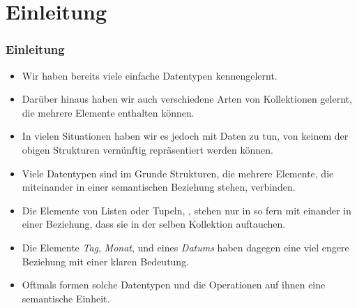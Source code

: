\documentclass[aspectratio=169,mathserif,notheorems]{beamer}%
\subtitle{41.~Klassen:~Grundlagen}%
\begin{document}
%
%
\startPresentation%
%
\section{Einleitung}%
\begin{frame}%
\frametitle{Einleitung}%
\begin{itemize}%
%
\item Wir haben bereits viele einfache Datentypen kennengelernt.%
%
\item<2-> Darüber hinaus haben wir auch verschiedene Arten von Kollektionen gelernt, die mehrere Elemente enthalten können.%
%
\item<3-> In vielen Situationen haben wir es jedoch mit Daten zu tun, von keinem der obigen Strukturen vernünftig repräsentiert werden können.%
%
\item<4-> Viele Datentypen sind im Grunde Strukturen, die mehrere Elemente, die miteinander in einer semantischen Beziehung stehen, verbinden.%
%
\item<5-> Die Elemente von Listen oder Tupeln, \DEzB, stehen nur in so fern mit einander in einer Beziehung, dass sie in der selben Kollektion auftauchen.%
%
\item<6-> Die Elemente \emph{Tag}, \emph{Monat}, und  eines \emph{Datums} haben dagegen eine viel engere Beziehung mit einer klaren Bedeutung.%
%
\item<7-> Oftmals formen solche Datentypen und die Operationen auf ihnen eine semantische Einheit.
\end{itemize}
\end{frame}%
%
\end{document}
